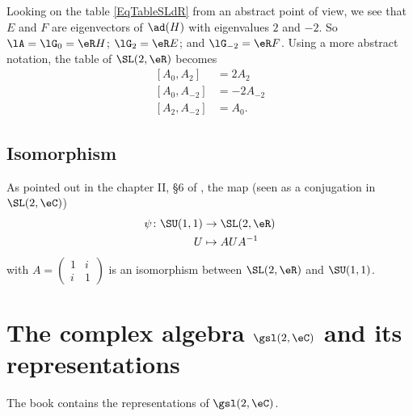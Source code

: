 Looking on the table \eqref{EqTableSLdR} from an abstract point of view, we see that $E$ and $F$ are eigenvectors of $\ad(H)$ with eigenvalues $2$ and $-2$. So $\lA=\lG_0=\eR H$; $\lG_2=\eR E$; and $\lG_{-2}=\eR F$. Using a more abstract notation, the table of $\SL(2,\eR)$ becomes
\begin{subequations}  \label{subeq_rootSLR}
\begin{align}
  [A_{0},A_{2}]&=2A_{2}\\
    [A_{0},A_{-2}]&=-2A_{-2}\\
    [A_{2},A_{-2}]&=A_{0}.
\end{align}
\end{subequations}

\subsection{Isomorphism}

As pointed out in the chapter II, \S6 of \cite{Knapp_reprez}, the map (seen as a conjugation in $\SL(2,\eC)$)
\begin{equation}
    \begin{aligned}
        \psi\colon \SU(1,1)&\to \SL(2,\eR) \\
        U&\mapsto AUA^{-1}
    \end{aligned}
\end{equation}
with $A=\begin{pmatrix}
1&i\\i&1
\end{pmatrix}$ is an isomorphism between $\SL(2,\eR)$ and $\SU(1,1)$.

                    \section{The complex algebra \texorpdfstring{$\protect\gsl(2,\eC)$}{sl2C} and its representations}
\label{SecsldeuxCandrepres}

The book \cite{Kassel} contains the representations of \( \gsl(2,\eC)\).

